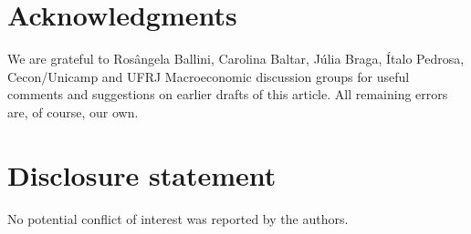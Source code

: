






\section*{Acknowledgments}

\noindent We are grateful to  Rosângela Ballini, Carolina Baltar, Júlia Braga, Ítalo Pedrosa, Cecon/Unicamp and UFRJ Macroeconomic discussion groups for useful comments and suggestions on earlier drafts of this article. All remaining errors are, of course, our own.

\section*{Disclosure statement}

\noindent No potential conflict of interest was reported by the authors.


\printbibliography{}

\begin{appendix}
	
\end{appendix}

